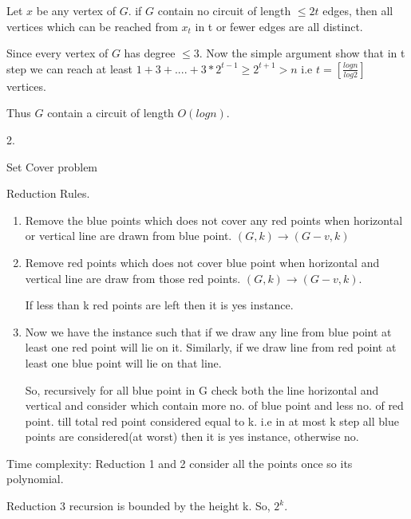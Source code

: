 \documentclass{homeworg}
\begin{document}
Let $x$ be any vertex of $G$. if $G$ contain no circuit of length $ \leq 2t$ edges, then all vertices which can be reached from $x_t$ in t or fewer edges are all distinct. 

Since every vertex of $G$ has degree $\leq 3$. Now the simple argument show that in t step we can reach at least 
$1+3+ .... + 3* 2^{t-1} \geq 2^{t+1} > n $ i.e 
$t=[\frac{log n}{log2}]$
vertices. 

Thus $G$ contain a circuit of length $O(log n)$.

2. 





\exercise 
Set Cover problem






\exercise 
Reduction Rules.
\begin{enumerate}

    \item Remove the blue points which does not cover any red points when horizontal or vertical line are drawn from blue point. $(G,k) \rightarrow (G-v,k)$  
    
    \item  Remove red points which does not cover blue point when horizontal and vertical line are draw from those red points. $(G,k) \rightarrow (G-v,k)$.
    
    If less than k red points are left then it is yes instance. 
    
 \item Now we have the instance such that if we draw any line from blue point at least one red point will lie on it. Similarly, if we draw line from red point at least one blue point will lie on that line.
 
 So, recursively for all blue point in G check both the line horizontal and vertical and consider which contain more no. of blue point and less no. of red point. till total red point considered equal to k. i.e in at most k step all blue points are considered(at worst) then it is yes instance, otherwise no.
 
 

\end{enumerate}
Time complexity: 
Reduction 1 and 2 consider all the points once so its polynomial.

Reduction 3 recursion is bounded by the height k. So, $2^k$.
\end{document}
